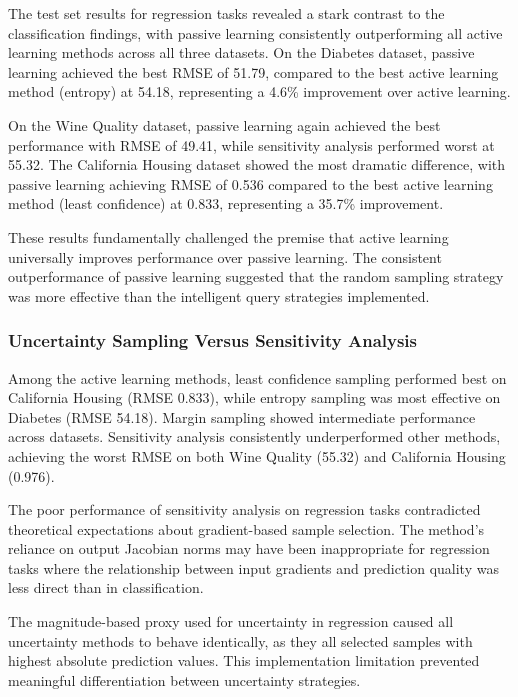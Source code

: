 \documentclass[conference]{IEEEtran}
\begin{document}
The test set results for regression tasks revealed a stark contrast to the classification findings, with passive learning consistently outperforming all active learning methods across all three datasets. On the Diabetes dataset, passive learning achieved the best RMSE of 51.79, compared to the best active learning method (entropy) at 54.18, representing a 4.6\% improvement over active learning.

On the Wine Quality dataset, passive learning again achieved the best performance with RMSE of 49.41, while sensitivity analysis performed worst at 55.32. The California Housing dataset showed the most dramatic difference, with passive learning achieving RMSE of 0.536 compared to the best active learning method (least confidence) at 0.833, representing a 35.7\% improvement.

These results fundamentally challenged the premise that active learning universally improves performance over passive learning. The consistent outperformance of passive learning suggested that the random sampling strategy was more effective than the intelligent query strategies implemented.

\subsubsection{Uncertainty Sampling Versus Sensitivity Analysis}

Among the active learning methods, least confidence sampling performed best on California Housing (RMSE 0.833), while entropy sampling was most effective on Diabetes (RMSE 54.18). Margin sampling showed intermediate performance across datasets. Sensitivity analysis consistently underperformed other methods, achieving the worst RMSE on both Wine Quality (55.32) and California Housing (0.976).

The poor performance of sensitivity analysis on regression tasks contradicted theoretical expectations about gradient-based sample selection. The method's reliance on output Jacobian norms may have been inappropriate for regression tasks where the relationship between input gradients and prediction quality was less direct than in classification.

The magnitude-based proxy used for uncertainty in regression caused all uncertainty methods to behave identically, as they all selected samples with highest absolute prediction values. This implementation limitation prevented meaningful differentiation between uncertainty strategies.
\end{document}

